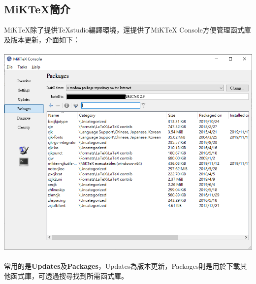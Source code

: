 \documentclass[12pt]{article}
\begin{document}
\begin{CJK*}{UTF8}{bsmi}
		\section{MiKTeX簡介}
			\hspace{25pt}MiKTeX除了提供TeXstudio編譯環境，還提供了MiKTeX Console方便管理函式庫及版本更新，介面如下： \\ \\
			\includegraphics[scale=0.7]{MiKTeX_console} \\ \\
			\hspace{25pt}常用的是\textbf{Updates}及\textbf{Packages}，Updates為版本更新，Packages則是用於下載其他函式庫，可透過搜尋找到所需函式庫。
			
		\newpage
			

\end{CJK*}
\end{document}
